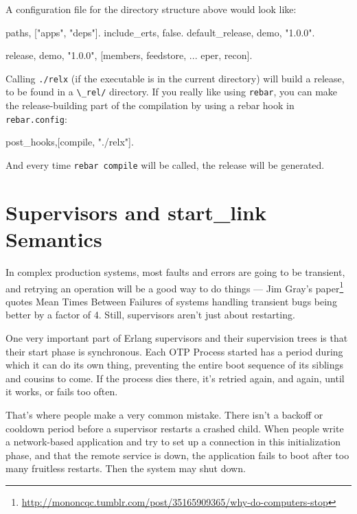\documentclass[11pt, oneside]{book}   	%
\newcommand{\filename}[1]{\Verb`#1`}
\newcommand{\app}[1]{\Verb`#1`}
\newcommand{\command}[1]{\Verb`#1`}
\begin{document}
A configuration file for the directory structure above would look like:

\begin{VerbatimText}
{paths, ["apps", "deps"]}.
{include_erts, false}. %
{default_release, demo, "1.0.0"}.

{release, {demo, "1.0.0"},
    [members,
     feedstore,
     ...
     eper,
     recon]}.
\end{VerbatimText}

Calling \command{./relx} (if the executable is in the current directory) will build a release, to be found in a \filename{\_rel/} directory. If you really like using \app{rebar}, you can make the release-building part of the compilation by using a rebar hook in \filename{rebar.config}:

\begin{VerbatimText}
{post_hooks,[{compile, "./relx"}]}.
\end{VerbatimText}

And every time \command{rebar compile} will be called, the release will be generated.

\section{Supervisors and start\_link Semantics}
\label{sec:supervisors-and-start-link-semantics}

In complex production systems, most faults and errors are going to be transient, and retrying an operation will be a good way to do things — Jim Gray's paper\footnote{\href{http://mononcqc.tumblr.com/post/35165909365/why-do-computers-stop}{http://mononcqc.tumblr.com/post/35165909365/why-do-computers-stop}} quotes Mean Times Between Failures of systems handling transient bugs being better by a factor of 4. Still, supervisors aren't just about restarting.

One very important part of Erlang supervisors and their supervision trees is that their start phase is synchronous. Each OTP Process started has a period during which it can do its own thing, preventing the entire boot sequence of its siblings and cousins to come. If the process dies there, it's retried again, and again, until it works, or fails too often.

That's where people make a very common mistake. There isn't a backoff or cooldown period before a supervisor restarts a crashed child. When people write a network-based application and try to set up a connection in this initialization phase, and that the remote service is down, the application fails to boot after too many fruitless restarts. Then the system may shut down.
\end{document}
